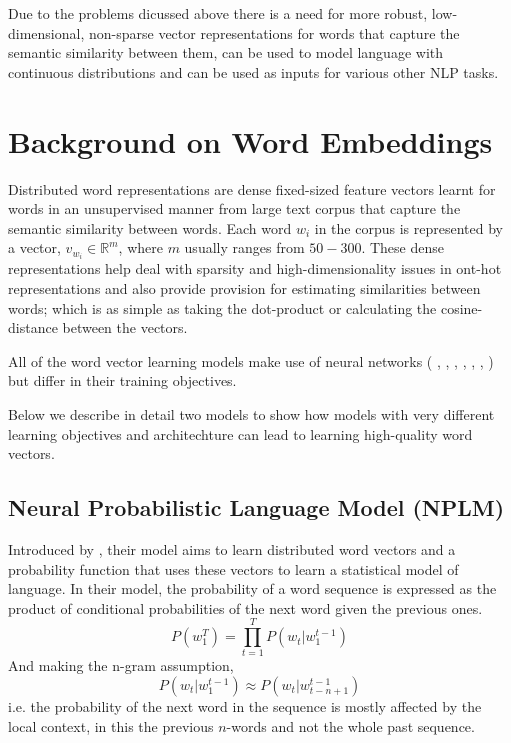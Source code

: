 Due to the problems dicussed above there is a need for more robust, low-dimensional, non-sparse vector representations for words that capture the semantic similarity between them, can be used to model language with continuous distributions and can be used as inputs for various other NLP tasks. 

\section{Background on Word Embeddings}
\label{sec:background_distributed}
Distributed word representations are dense fixed-sized feature vectors learnt for words in an unsupervised manner from large text corpus that capture the semantic similarity between words. Each word $w_{i}$ in the corpus is represented by a vector, $v_{w_{i}} \in \mathbb{R}^{m}$, where $m$ usually ranges from $50-300$. These dense representations help deal with sparsity and high-dimensionality issues in ont-hot representations and also provide provision for estimating similarities between words; which is as simple as taking the dot-product or calculating the cosine-distance between the vectors. 

All of the word vector learning models make use of neural networks  ( \citep{bengio2003neural}, \citep{mnih2013learning}, \citep{mikolov2013distributed}, \citep{collobert2011natural}, \citep{bottou2014machine}, \citep{turian2010word}, \citep{levy2014dependencybased} ) but differ in their training objectives. 

Below we describe in detail two models to show how models with very different learning objectives and architechture can lead to learning high-quality word vectors.

\subsection{Neural Probabilistic Language Model (NPLM)}
\label{sec:bengio}
Introduced by \cite{bengio2003neural}, their model aims to learn distributed word vectors and a probability function that uses these vectors to learn a statistical model of language. In their model, the probability of a word sequence is expressed as the product of conditional probabilities of the next word given the previous ones. 
\begin{equation}
P(w_{1}^{T}) =  \prod_{t=1}^{T} P(w_{t}| w_{1}^{t-1})
\end{equation}
And making the n-gram assumption, 
\begin{equation}
P(w_{t} | w_{1}^{t-1}) \approx P(w_{t} | w_{t-n+1}^{t-1})
\end{equation}
i.e. the probability of the next word in the sequence is mostly affected by the local context, in this the previous $n$-words and not the whole past sequence.

